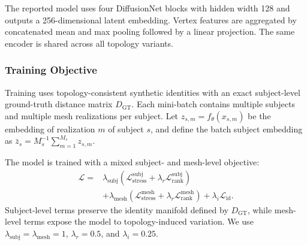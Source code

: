 The reported model uses four DiffusionNet blocks with hidden width 128 and outputs a 256-dimensional latent embedding. Vertex features are aggregated by concatenated mean and max pooling followed by a linear projection. The same encoder is shared across all topology variants.
\subsubsection{Training Objective}
\label{sec:training_objective}

Training uses topology-consistent synthetic identities with an exact subject-level
ground-truth distance matrix $D_{\mathrm{GT}}$. Each mini-batch contains multiple
subjects and multiple mesh realizations per subject. Let
$z_{s,m}=f_\theta(x_{s,m})$ be the embedding of realization $m$ of subject $s$,
and define the batch subject embedding as
$\bar z_s = M_s^{-1}\sum_{m=1}^{M_s} z_{s,m}$.

The model is trained with a mixed subject- and mesh-level objective:
\begin{equation}
\begin{split}
\mathcal L ={}&
\lambda_{\mathrm{subj}}
\left(
\mathcal L^{\mathrm{subj}}_{\mathrm{stress}}
+
\lambda_r \mathcal L^{\mathrm{subj}}_{\mathrm{rank}}
\right)
\\
&+
\lambda_{\mathrm{mesh}}
\left(
\mathcal L^{\mathrm{mesh}}_{\mathrm{stress}}
+
\lambda_r \mathcal L^{\mathrm{mesh}}_{\mathrm{rank}}
\right)
+
\lambda_i \mathcal L_{\mathrm{id}} .
\end{split}
\end{equation}
Subject-level terms preserve the identity manifold defined by $D_{\mathrm{GT}}$,
while mesh-level terms expose the model to topology-induced variation. We use
$\lambda_{\mathrm{subj}}=\lambda_{\mathrm{mesh}}=1$, $\lambda_r=0.5$, and
$\lambda_i=0.25$.

